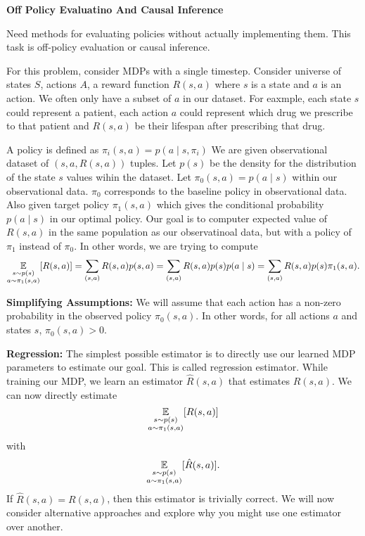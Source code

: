 \documentclass[12pt,letterpaper,boxed]{hmcpset}
\begin{document}
\newpage
\begin{problem}[Problem 2]
  \textbf{Off Policy Evaluatino And Causal Inference}

  Need methods for evaluating policies without actually implementing them. This task is off-policy evaluation or causal inference.

  For this problem, consider MDPs with a single timestep. Consider universe of states $S$, actions $A$, a reward function $R(s, a)$ where $s$ is a state and $a$ is an action. We often only have a subset of $a$ in our dataset. For eaxmple, each state $s$ could represent a patient, each action $a$ could represent which drug we prescribe to that patient and $R(s, a)$ be their lifespan after prescribing that drug.

  A policy is defined as $\pi_i (s, a) = p(a \mid s, \pi_i)$ We are given observational dataset of $(s, a, R(s, a))$ tuples. Let $p(s)$ be the density for the distribution of the state $s$ values wihin the dataset. Let $\pi_0 (s, a) = p(a \mid s)$ within our observational data. $\pi_0$ corresponds to the baseline policy in observational data. Also given target policy $\pi_1 (s,a)$ which gives the conditional probability $p(a \mid s)$ in our optimal policy. Our goal is to computer expected value of $R(s,a)$ in the same population as our observatinoal data, but with a policy of $\pi_1$ instead of $\pi_0$. In other words, we are trying to compute
  \[
  \operatorname*{\mathbb{E}}_{\substack{s \sim p(s) \\ a \sim \pi_1(s,a)}} [R(s, a)] = \sum_{(s,a)} R(s,a) p(s,a) = \sum_{(s,a)} R(s,a) p(s) p(a \mid s) = \sum_{(s,a)} R(s,a) p(s) \pi_1 (s,a).
  \]

  \textbf{Simplifying Assumptions: } We will assume that each action has a non-zero probability in the observed policy $\pi_0 (s, a)$. In other words, for all actions $a$ and states $s$, $\pi_0 (s,a) > 0$.

  \textbf{Regression:} The simplest possible estimator is to directly use our learned MDP parameters to estimate our goal. This is called regression estimator. While training our MDP, we learn an estimator $\hat R(s,a)$ that estimates $R(s,a)$. We can now directly estimate
  \[
  \operatorname*{\mathbb{E}}_{\substack{s \sim p(s) \\ a \sim \pi_1(s,a)}} [R(s, a)]
  \]
  with 
  \[
    \operatorname*{\mathbb{E}}_{\substack{s \sim p(s) \\ a \sim \pi_1(s,a)}} [\hat R(s, a)].
  \]
  If $\hat R(s,a) = R(s,a)$, then this estimator is trivially correct. We will now consider alternative approaches and explore why you might use one estimator over another.
\end{problem}
\end{document}
